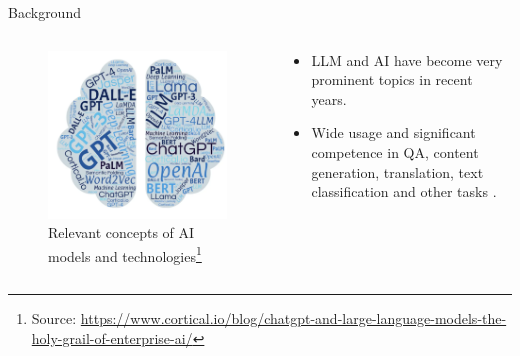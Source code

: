 \documentclass[t]{beamer}
\begin{document}
\begin{frame}{Background}
  \begin{columns}
    \begin{column}{0.4\textwidth}
        \begin{figure}
            \centering
            \includegraphics[width=\textwidth]{llm1.png}
            \caption{Relevant concepts of AI models and technologies\footnote{Source: \url{https://www.cortical.io/blog/chatgpt-and-large-language-models-the-holy-grail-of-enterprise-ai/}}}
            \label{fig:llm1}
        \end{figure}
    \end{column}
    \begin{column}{0.5\textwidth}
        \begin{itemize}
            \item LLM and AI have become very prominent topics in recent years.
            \item Wide usage and significant competence in QA, content generation, translation, text classification and other tasks \cite{Liu23}.
        \end{itemize}
    \end{column}
\end{columns}
\end{frame}
\end{document}
